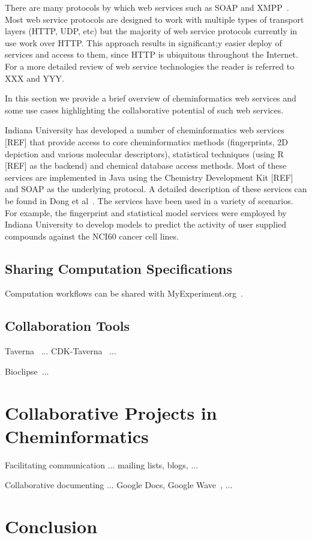 \documentclass[12pt]{book}
\begin{document}
There are many protocols by which web services such as SOAP and
XMPP~\cite{Wagener2009}. Most web service protocols are designed to
work with multiple types of transport layers (HTTP, UDP, etc) but the
majority of web service protocols currently in use work over
HTTP. This approach results in significant;y easier deploy of services
and access to them, since HTTP is ubiquitous throughout the
Internet. For a more detailed review of web service technologies the
reader is referred to XXX and YYY.

In this section we provide a brief overview of cheminformatics web
services and some use cases highlighting the collaborative potential
of such web services.

Indiana University has developed a number of cheminformatics web
services [REF] that provide access to core cheminformatics methods
(fingerprints, 2D depiction and various molecular descriptors),
statistical techniques (using R [REF] as the backend) and chemical
database access methods. Most of these services are implemented in
Java using the Chemistry Development Kit [REF] and SOAP as the
underlying protocol. A detailed description of these services can be
found in Dong et al~\cite{Dong2007Web}. The services have been used in
a variety of scenarios. For example, the fingerprint and statistical
model services were employed by Indiana University to develop
models to predict the activity of user supplied compounds against the
NCI60 cancer cell lines.




\subsection{Sharing Computation Specifications}

Computation workflows can be shared with MyExperiment.org~\cite{Goble2010}.

\subsection{Collaboration Tools}

Taverna~\cite{Oinn2004} ... CDK-Taverna~\cite{Kuhn2010} ...

Bioclipse~\cite{Spjuth2009,Spjuth2007}...

\section{Collaborative Projects in Cheminformatics}

Facilitating communication ... mailing lists, blogs, ...

Collaborative documenting ... Google Docs, Google Wave~\cite{Neylon2009}, ...

\section{Conclusion}



\end{document}
